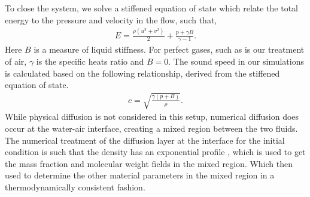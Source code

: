 To close the system, we solve a stiffened equation of state which
relate the total energy to the pressure and velocity in the flow, such
that,
% 
\begin{align} \label{eq:stiffened_eos}%
  E=\frac{\rho\left(u^2+v^2\right)}{2} + \frac{p+\gamma B}{\gamma-1}.
\end{align}
%
Here $B$ is a measure of liquid stiffness. For perfect gases, such as
is our treatment of air, $\gamma$ is the specific heats ratio and
$B=0$. The sound speed in our simulations is calculated based on the
following relationship, derived from the stiffened equation of state.
%
\begin{align}
  c = \sqrt{\frac{\gamma\left(p+B\right)}{\rho}}.
\end{align}
%
While physical diffusion is not considered in this setup, numerical
diffusion does occur at the water-air interface, creating a mixed
region between the two fluids. The numerical treatment of the
diffusion layer at the interface for the initial condition is such
that the density has an exponential profile \citep{Latini2007}, which
is used to get the mass fraction and molecular weight fields in the
mixed region. Which then used to determine the other material
parameters in the mixed region in a thermodynamically consistent
fashion.

